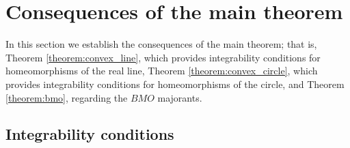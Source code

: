 \documentclass{amsart}
\theoremstyle{plain}
\theoremstyle{definition}
\theoremstyle{remark}
\numberwithin{equation}{section}
\numberwithin{theorem}{section}
\numberwithin{conjecture}{section}
\newcommand{\1}{\mathbf 1}
\begin{document}
\bigskip

\section{Consequences of the main theorem}\label{section:consequences}

In this section we establish the consequences of the main theorem; that is, Theorem \ref{theorem:convex_line}, which provides integrability conditions for homeomorphisms of the real line, Theorem \ref{theorem:convex_circle}, which provides integrability conditions for homeomorphisms of the circle, and Theorem \ref{theorem:bmo}, regarding the $BMO$ majorants.


\subsection{Integrability conditions}
\end{document}
